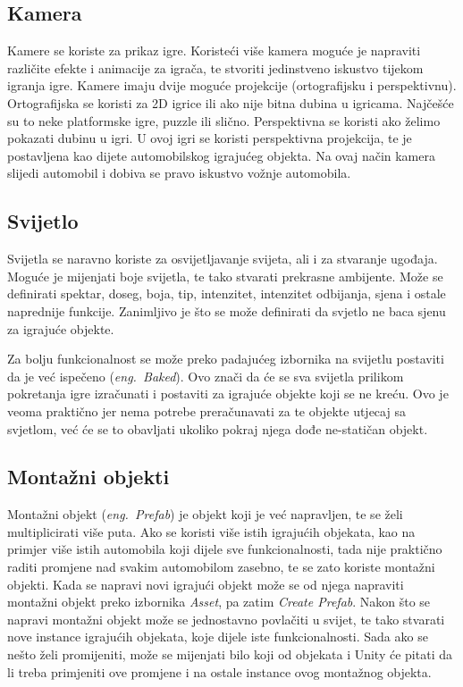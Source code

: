 \subsection{Kamera}
Kamere se koriste za prikaz igre. Koristeći više kamera moguće je napraviti različite efekte i animacije za igrača, te stvoriti jedinstveno iskustvo tijekom igranja igre. Kamere imaju dvije moguće projekcije (ortografijsku i perspektivnu). Ortografijska se koristi za 2D igrice ili ako nije bitna dubina u igricama. Najčešće su to neke platformske igre, puzzle ili slično. Perspektivna se koristi ako želimo pokazati dubinu u igri. U ovoj igri se koristi perspektivna projekcija, te je postavljena kao dijete automobilskog igrajućeg objekta. Na ovaj način kamera slijedi automobil i dobiva se pravo iskustvo vožnje automobila.
\subsection{Svijetlo}
Svijetla se naravno koriste za osvijetljavanje svijeta, ali i za stvaranje ugođaja. Moguće je mijenjati boje svijetla, te tako stvarati prekrasne ambijente. Može se definirati spektar, doseg, boja, tip, intenzitet, intenzitet odbijanja, sjena i ostale naprednije funkcije. Zanimljivo je što se može definirati da svjetlo ne baca sjenu za igrajuće objekte.

Za bolju funkcionalnost se može preko padajućeg izbornika na svijetlu postaviti da je već ispečeno (\emph{eng.~Baked}). Ovo znači da će se sva svijetla prilikom pokretanja igre izračunati i postaviti za igrajuće objekte koji se ne kreću. Ovo je veoma praktično jer nema potrebe preračunavati za te objekte utjecaj sa svjetlom, već će se to obavljati ukoliko pokraj njega dođe ne-statičan objekt.
\subsection{Montažni objekti}
Montažni objekt (\emph{eng.~Prefab}) je objekt koji je već napravljen, te se želi multiplicirati više puta. Ako se koristi više istih igrajućih objekata, kao na primjer više istih automobila koji dijele sve funkcionalnosti, tada nije praktično raditi promjene nad svakim automobilom zasebno, te se zato koriste montažni objekti. Kada se napravi novi igrajući objekt može se od njega napraviti montažni objekt preko izbornika \emph{Asset}, pa zatim \emph{Create Prefab}. Nakon što se napravi montažni objekt može se jednostavno povlačiti u svijet, te tako stvarati nove instance igrajućih objekata, koje dijele iste funkcionalnosti. Sada ako se nešto želi promijeniti, može se mijenjati bilo koji od objekata i Unity će pitati da li treba primjeniti ove promjene i na ostale instance ovog montažnog objekta.

